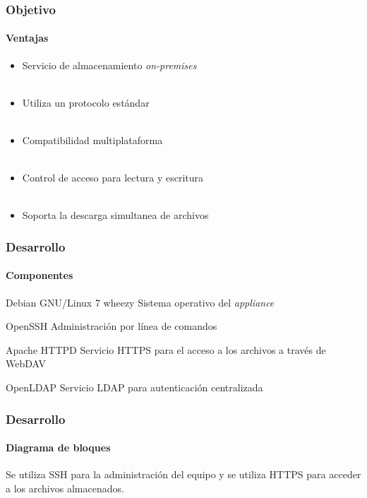 \documentclass{beamer}
\begin{document}
\begin{frame}
\frametitle{Objetivo}
\framesubtitle{Ventajas}
\justifying

\begin{itemize}
\justifying
  \item Servicio de almacenamiento \textit{on-premises}
\\~\\
  \item Utiliza un protocolo est\'{a}ndar
\\~\\
  \item Compatibilidad multiplataforma
\\~\\
  \item Control de acceso para lectura y escritura
\\~\\
  \item Soporta la descarga simultanea de archivos
\end{itemize}

\end{frame}

\begin{frame}
\frametitle{Desarrollo}
\framesubtitle{Componentes}
\justifying

\begin{block}{Debian GNU/Linux 7 \guillemotleft wheezy\guillemotright}
 Sistema operativo del \textsl{appliance}
\end{block}
\begin{block}{\textup{OpenSSH}}
 Administraci\'{o}n por l\'{i}nea de comandos
\end{block}
\begin{block}{Apache \textup{HTTPD}}
 Servicio \textup{HTTPS} para el acceso a los archivos a trav\'{e}s de \textup{WebDAV}
\end{block}
\begin{block}{\textup{OpenLDAP}}
 Servicio LDAP para autenticaci\'{o}n centralizada
\end{block}

\end{frame}

\begin{frame}
\frametitle{Desarrollo}
\framesubtitle{Diagrama de bloques}

Se utiliza \textup{SSH} para la administraci\'{o}n del equipo y se utiliza \textup{HTTPS} para acceder a los archivos almacenados.

\vspace{1.7em}

\centering
 {
  
 }

\end{frame}
\end{document}
